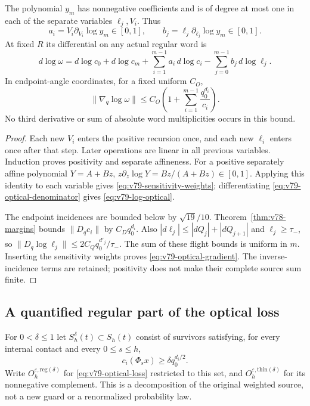 \begin{proposition}
\label{prop:v79-optical-sensitivity}
The polynomial $y_m$ has nonnegative coefficients and is of degree
at most one in each of the separate variables $\ell_j,V_i$. Thus
\begin{equation}\label{eq:v79-sensitivity-weights}
 a_i=V_i\partial_{V_i}\log y_m\in[0,1],\qquad
 b_j=\ell_j\partial_{\ell_j}\log y_m\in[0,1].
\end{equation}
At fixed $R$ its differential on any actual regular word is
\begin{equation}\label{eq:v79-log-optical}
 d\log\omega=d\log c_0+d\log c_m
       +\sum_{i=1}^{m-1}a_i\,d\log c_i
       -\sum_{j=0}^{m-1}b_j\,d\log\ell_j.
\end{equation}
In endpoint-angle coordinates, for a fixed uniform $C_O$,
\begin{equation}\label{eq:v79-optical-gradient}
 \|\nabla_q\log\omega\|
       \le C_O\left(1+\sum_{i=1}^{m-1}\frac{q_0^{d_i}}{c_i}\right).
\end{equation}
No third derivative or sum of absolute word multiplicities occurs
in this bound.
\end{proposition}
\begin{proof}
Each new $V_i$ enters the positive recursion once, and each new
$\ell_i$ enters once after that step. Later operations are linear in
all previous variables. Induction proves positivity and separate
affineness. For a positive separately affine polynomial $Y=A+Bz$,
$z\partial_z\log Y=Bz/(A+Bz)\in[0,1]$. Applying this identity to each
variable gives \eqref{eq:v79-sensitivity-weights}; differentiating
\eqref{eq:v79-optical-denominator} gives \eqref{eq:v79-log-optical}.

The endpoint incidences are bounded below by $\sqrt{19}/10$.
Theorem~\ref{thm:v78-margins} bounds $\|D_qc_i\|$ by $C_Dq_0^{d_i}$.
Also $|d\ell_j|\le|dQ_j|+|dQ_{j+1}|$ and $\ell_j\ge\tau_-$, so
$\|D_q\log\ell_j\|\le2C_Qq_0^{d'_j}/\tau_-$. The sum of these
flight bounds is uniform in $m$. Inserting the sensitivity weights
proves \eqref{eq:v79-optical-gradient}. The inverse-incidence terms
are retained; positivity does not make their complete source sum finite.
\end{proof}

\subsection{A quantified regular part of the optical loss}
For $0<\delta\le1$ let $S_h^\delta(t)\subset S_h(t)$ consist of
survivors satisfying, for every internal contact and every $0\le s\le h$,
\begin{equation}\label{eq:v79-incidence-corridor}
               c_i(\Phi_sx)\ge\delta q_0^{d_i/2}.
\end{equation}
Write $O_h^{\varepsilon,\mathrm{reg}(\delta)}$ for
\eqref{eq:v79-optical-loss} restricted to this set, and
$O_h^{\varepsilon,\mathrm{thin}(\delta)}$ for its nonnegative complement.
This is a decomposition of the original weighted source, not a new
guard or a renormalized probability law.

